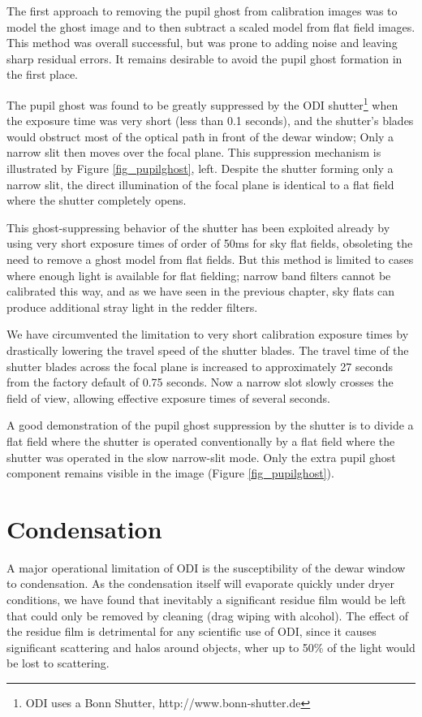 \documentclass[]{spieman}
\begin{document}
The first approach to removing the pupil ghost from calibration images was to
model the ghost image and to then subtract a scaled model from flat field
images. This method was overall successful, but was prone to adding noise and
leaving sharp residual errors. It remains desirable to avoid the pupil ghost
formation in the first place.

The pupil ghost was found to be greatly suppressed by the ODI
shutter\footnote{ODI uses a Bonn Shutter, http://www.bonn-shutter.de} when the
exposure time was very short (less than 0.1 seconds), and the shutter's blades
would obstruct most of the optical path in front of the dewar window; Only a narrow
slit then moves  over the focal plane. This suppression mechanism is illustrated
by Figure \ref{fig_pupilghost}, left. Despite the shutter forming
only a narrow slit, the direct illumination of the focal plane is identical to a
flat field where the shutter completely opens.

This ghost-suppressing behavior of the shutter has been exploited already by
using very short exposure times of order of 50ms for sky flat fields, obsoleting
the need to remove a ghost model from flat fields. But this method is limited to
cases where enough light is available for flat fielding; narrow band filters
cannot be calibrated this way, and as we have seen in the previous chapter, sky
flats can produce additional stray light in the redder filters.

We have circumvented the limitation to very short calibration exposure times by
drastically lowering the travel speed of the shutter blades. The travel time of
the shutter blades across the focal plane is increased to approximately  27
seconds from the factory default of 0.75 seconds.  Now a narrow slot slowly
crosses the field of view, allowing effective exposure times of several seconds.

A good demonstration of the pupil ghost suppression by the shutter is to divide
a flat field where the shutter is operated conventionally by a flat field where
the shutter was operated in the slow narrow-slit mode. Only the extra pupil ghost
component remains visible in the image (Figure \ref{fig_pupilghost}).


\section{Condensation}

A major operational limitation of ODI is the susceptibility of the dewar window
to condensation. As the condensation itself will evaporate quickly under dryer
conditions, we have found that inevitably a significant residue film would be
left that could only be removed by  cleaning (drag wiping with alcohol).
The effect of the residue film is detrimental for any scientific use of ODI,
since it causes significant scattering and halos around objects, wher up to 
50\%  of the light would be lost to scattering.
\end{document}
